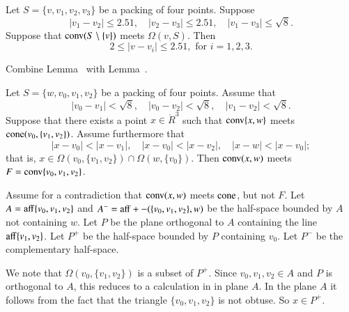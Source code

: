 \begin{tarskidata}
\begin{tarski}
\begin{lemma}
Let $S=\{v,v_1,v_2,v_3\}$ be a
packing of four points. Suppose
  $$
  |v_1-v_2|\le 2.51,\quad 
  |v_2-v_3|\le 2.51,\quad
  |v_1-v_3|\le \sqrt{8}.
  $$
Suppose that
${\operatorname{conv}}(S\setminus \{v\})$ meets $\Omega(v,S)$.
Then
  $$
  2 \le |v-v_i | \le 2.51, \text{ for } i=1,2,3.
  $$
\end{lemma}

\begin{proved}
Combine Lemma~ with Lemma~.
\swallowed\end{proved}
\end{tarski}






\begin{tarski}

\begin{lemma}
Let $S=\{w,v_0,v_1,v_2\}$ be a packing of four points.
Assume that
   $$
   |v_0-v_1| < \sqrt8,\quad |v_0-v_2| < \sqrt8,\quad |v_1-v_2| < \sqrt8.
   $$
Suppose that there exists a point $x\in\ring{R}^3$
such that 
  ${\operatorname{conv}}\{x,w\}$ meets ${\operatorname{cone}}(v_0,\{v_1,v_2\})$.  
Assume furthermore that
  $$
  |x-v_0| < |x-v_1|,\quad 
  |x-v_0| < |x-v_2|,\quad
  |x-w| < |x-v_0|;
  $$
that is, $x\in\Omega(v_0,\{v_1,v_2\})\cap \Omega(w,\{v_0\})$.
Then ${\operatorname{conv}}(x,w)$ meets $F={\operatorname{conv}}\{v_0,v_1,v_2\}$.
\end{lemma}


\begin{proved} 
Assume for a contradiction that ${\operatorname{conv}}(x,w)$ meets ${\operatorname{cone}}$,
but not $F$.  Let $A = {\operatorname{aff}}\{v_0,v_1,v_2\}$ and $A^-={\operatorname{aff}}+-(\{v_0,v_1,v_2\},w)$
be the half-space bounded by $A$ not containing $w$. 
Let $P$
be the plane orthogonal to $A$ containing the line ${\operatorname{aff}}\{v_1,v_2\}$.
Let $P^+$ be the half-space bounded by $P$ containing $v_0$.  Let
$P^-$ be the complementary half-space.

We note that $\Omega(v_0,\{v_1,v_2\})$ is a subset of $P^+$.  Since
$v_0,v_1,v_2\in A$ and $P$ is orthogonal to $A$, this reduces to
a calculation in in plane $A$.  In the plane $A$ it follows from
the fact that the triangle $\{v_0,v_1,v_2\}$ is not obtuse.  So $x\in P^+$.


\end{proved}
\end{tarski}
\end{tarskidata}
